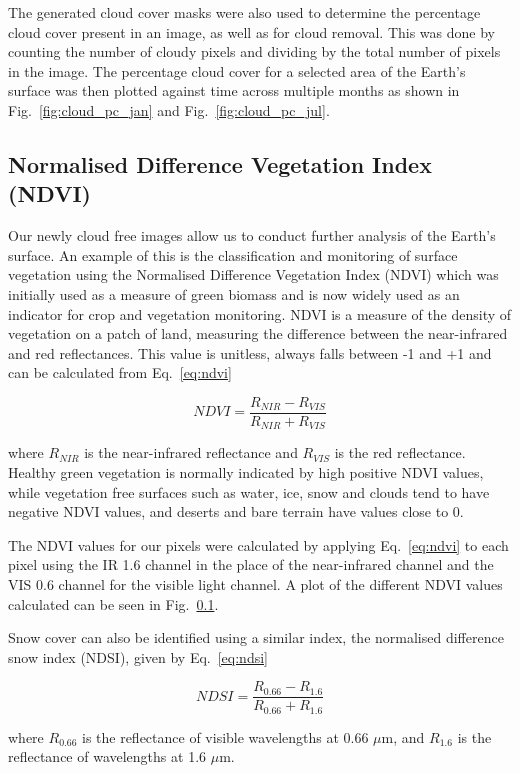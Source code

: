 The generated cloud cover masks were also used to determine the percentage cloud cover present in an image, as well as for cloud removal. This was done by counting the number of cloudy pixels and dividing by the total number of pixels in the image. The percentage cloud cover for a selected area of the Earth's surface was then plotted against time across multiple months as shown in Fig.~\ref{fig:cloud_pc_jan} and Fig.~\ref{fig:cloud_pc_jul}.

\subsection{Normalised Difference Vegetation Index (NDVI)}
Our newly cloud free images allow us to conduct further analysis of the Earth's surface. An example of this is the classification and monitoring of surface vegetation using the Normalised Difference Vegetation Index (NDVI) which was initially used as a measure of green biomass and is now widely used as an indicator for crop and vegetation monitoring. NDVI is a measure of the density of vegetation on a patch of land, measuring the difference between the near-infrared and red reflectances. This value is unitless,  always falls between -1 and +1 and can be calculated from Eq.~\ref{eq:ndvi}

\begin{equation}\label{eq:ndvi}
    NDVI = \frac{R_{NIR}-R_{VIS}}{R_{NIR}+R_{VIS}}
\end{equation}

where $R_{NIR}$ is the near-infrared reflectance and $R_{VIS}$ is the red reflectance.
Healthy green vegetation is normally indicated by high positive NDVI values, while vegetation free surfaces such as water, ice, snow and clouds tend to have negative NDVI values, and deserts and bare terrain have values close to 0.

The NDVI values for our pixels were calculated by applying Eq.~\ref{eq:ndvi} to each pixel using the IR 1.6 channel in the place of the near-infrared channel and the VIS 0.6 channel for the visible light channel. A plot of the different NDVI values calculated can be seen in Fig.~\ref{}.

\par Snow cover can also be identified using a similar index, the normalised difference snow index (NDSI), given by Eq.~\ref{eq:ndsi}

\begin{equation}\label{eq:ndsi}
    NDSI = \frac{R_{0.66}-R_{1.6}}{R_{0.66}+R_{1.6}}
\end{equation}

where $R_{0.66}$ is the reflectance of visible wavelengths at 0.66 $\mu$m, and $R_{1.6}$ is the reflectance of wavelengths at 1.6 $\mu$m.





